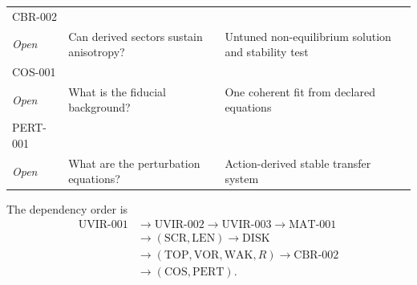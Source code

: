 \begin{center}
\begin{tabular}{@{}p{}p{}p{}@{}}
CBR-002\\\textit{Open} & Can derived sectors sustain anisotropy? & Untuned non-equilibrium solution and stability test \\
COS-001\\\textit{Open} & What is the fiducial background? & One coherent fit from declared equations \\
PERT-001\\\textit{Open} & What are the perturbation equations? & Action-derived stable transfer system \\
\bottomrule
\end{tabular}
\end{center}

The dependency order is
\begin{align}
 \mathrm{UVIR\mbox{-}001}&\to\mathrm{UVIR\mbox{-}002}
 \to\mathrm{UVIR\mbox{-}003}\to\mathrm{MAT\mbox{-}001}\nonumber\\
 &\to(\mathrm{SCR},\mathrm{LEN})\to\mathrm{DISK}\nonumber\\
 &\to(\mathrm{TOP},\mathrm{VOR},\mathrm{WAK},R)
 \to\mathrm{CBR\mbox{-}002}\nonumber\\
 &\to(\mathrm{COS},\mathrm{PERT}).
\end{align}

